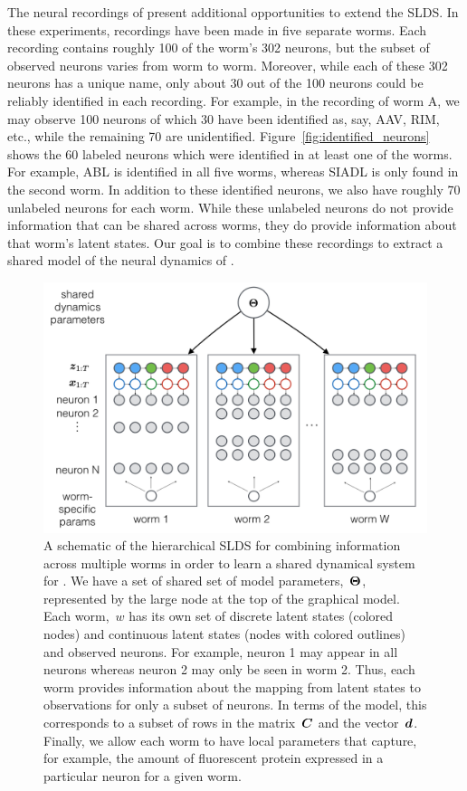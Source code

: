 \documentclass{article}
\begin{document}
The neural recordings of \citet{kato2015global} present additional
opportunities to extend the SLDS. In these experiments, recordings
have been made in five separate worms. Each recording contains roughly
100 of the worm's 302 neurons, but the subset of observed neurons
varies from worm to worm. Moreover, while each of these 302 neurons
has a unique name, only about 30 out of the 100 neurons could be
reliably identified in each recording. For example, in the recording
of worm A, we may observe 100 neurons of which 30 have been identified
as, say, {AAV}, {RIM}, etc., while the remaining 70 are unidentified.
Figure~\ref{fig:identified_neurons} shows the 60 labeled neurons which
were identified in at least one of the worms. For example, ABL is
identified in all five worms, whereas SIADL is only found in the
second worm.  In addition to these identified neurons, we also have
roughly 70 unlabeled neurons for each worm. While these unlabeled
neurons do not provide information that can be shared across worms,
they do provide information about that worm's latent states.  Our goal
is to combine these recordings to extract a shared model of the neural
dynamics of \celegans.

\begin{figure}[t]
\centering%
\includegraphics[width=5.5in]{hslds.png} 
\caption{A schematic of the hierarchical SLDS for combining information
  across multiple worms in order to learn a shared dynamical system
  for \celegans.  We have a set of shared set of model parameters,~$\boldsymbol{\Theta}$,
  represented by the large node at the top of the graphical model. Each
  worm,~$w$ has its own set of discrete latent states (colored nodes)
  and continuous latent states (nodes with colored outlines) and observed neurons.
  For example, neuron 1 may appear in all neurons whereas neuron 2
  may only be seen in worm 2. Thus, each worm provides information
  about the mapping from latent states to observations for only a
  subset of neurons. In terms of the model, this corresponds to a
  subset of rows in the matrix~$\boldsymbol{C}$ and the vector~$\boldsymbol{d}$. Finally,
  we allow each worm to have local parameters that capture, for example,
  the amount of fluorescent protein expressed in a particular neuron
  for a given worm. 
}
\label{fig:hslds}
\end{figure}
\end{document}
